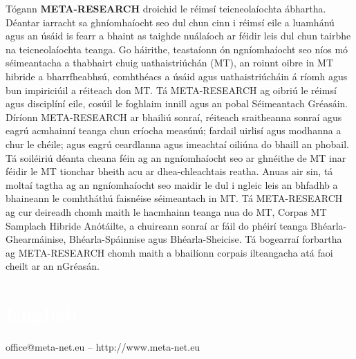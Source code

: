 \begin{multicols}{2}
Tógann \textbf{META-RESEARCH} droichid le réimsí teicneolaíochta ábhartha. Déantar iarracht sa ghníomhaíocht seo dul chun cinn i réimsí eile a luamhánú agus an úsáid is fearr a bhaint as taighde nuálaíoch ar féidir leis dul chun tairbhe na teicneolaíochta teanga. Go háirithe, teastaíonn ón ngníomhaíocht seo níos mó séimeantacha a thabhairt chuig uathaistriúchán (MT), an roinnt oibre in MT hibride a bharrfheabhsú, comhthéacs a úsáid agus uathaistriúcháin á ríomh agus bun impiriciúil a réiteach don MT. Tá META-RESEARCH ag oibriú le réimsí agus disciplíní eile, cosúil le foghlaim innill agus an pobal Séimeantach Gréasáin. Díríonn META-RESEARCH ar bhailiú sonraí, réiteach sraitheanna sonraí agus eagrú acmhainní teanga chun críocha measúnú; fardail uirlisí agus modhanna a chur le chéile; agus eagrú ceardlanna agus imeachtaí oiliúna do bhaill an phobail. Tá soiléiriú déanta cheana féin ag an ngníomhaíocht seo ar ghnéithe de MT inar féidir le MT tionchar bheith acu ar dhea-chleachtais reatha. Anuas air sin, tá moltaí tagtha ag an ngníomhaíocht seo maidir le dul i ngleic leis an bhfadhb a bhaineann le comhtháthú faisnéise séimeantach in MT. Tá META-RESEARCH ag cur deireadh chomh maith le hacmhainn teanga nua do MT, Corpas MT Samplach Hibride Anótáilte, a chuireann sonraí ar fáil do phéirí teanga Bhéarla-Ghearmáinise, Bhéarla-Spáinnise agus Bhéarla-Sheicise. Tá bogearraí forbartha ag META-RESEARCH chomh maith a bhailíonn corpais ilteangacha atá faoi cheilt ar an nGréasán.
\end{multicols}

\vfill

\makeatletter
{}
{
  \renewcommand*{\theHsection}{\thepart.\thesection}
}
\makeatother
\part*{\textcolor{white}{English}}
\setcounter{section}{0}
\setcounter{figure}{0}

\centerline{office@meta-net.eu -- http://www.meta-net.eu}


\cleardoublepage


